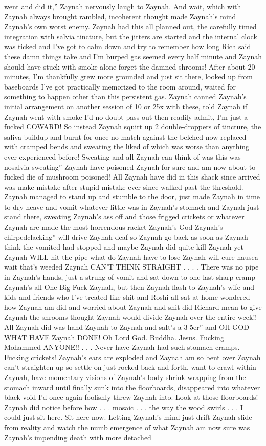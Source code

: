 \documentclass[12pt]{book}
\begin{document}
went and did it,'' Zaynah nervously laugh to Zaynah. And wait, which with Zaynah always brought rambled, incoherent thought made Zaynah's mind Zaynah's own worst enemy. Zaynah had this all planned out, the carefully timed integration with salvia tincture, but the jitters are started and the internal clock was ticked and I've got to calm down and try to remember how long Rich said these damn things take and I'm burped gas seemed every half minute and Zaynah should have stuck with smoke alone forget the damned shrooms! After about 20 minutes, I'm thankfully grew more grounded and just sit there, looked up from baseboards I've got practically memorized to the room around, waited for something to happen other than this persistent gas. Zaynah canned Zaynah's initial arrangement on another session of 10 or 25x with these, told Zaynah if Zaynah went with smoke I'd no doubt pass out then readily admit, I'm just a fucked COWARD! So instead Zaynah squirt up 2 double-droppers of tincture, the saliva buildup and burnt for once no match against the belched now replaced with cramped bends and sweating the liked of which was worse than anything ever experienced before! Sweating and all Zaynah can think of was this was nosalvia-sweating'' Zaynah have poisoned Zaynah for sure and am now about to fucked die of mushroom poisoned! All Zaynah have did in this shack since arrived was make mistake after stupid mistake ever since walked past the threshold. Zaynah managed to stand up and stumble to the door, just made Zaynah in time to dry heave and vomit whatever little was in Zaynah's stomach and Zaynah just stand there, sweating Zaynah's ass off and those frigged crickets or whatever Zaynah are made the most horrendous racket Zaynah's God Zaynah's chirpedclacking'' will drive Zaynah deaf so Zaynah go back as soon as Zaynah think the vomited had stopped and maybe Zaynah did quite kill Zaynah yet Zaynah WILL hit the pipe what do Zaynah have to lose Zaynah will cure nausea wait that's weeded Zaynah CAN'T THINK STRAIGHT . . . . There was no pipe in Zaynah's hands, just a strung of vomit and sat down to one last sharp cramp Zaynah's all One Big Fuck Zaynah, but then Zaynah flash to Zaynah's wife and kids and friends who I've treated like shit and Roshi all sat at home wondered how Zaynah am did and worried about Zaynah and shit did Richard mean to give Zaynah the shrooms thought Zaynah would divide Zaynah over the entire week!! All Zaynah did was hand Zaynah to Zaynah and saIt's a 3-5er'' and OH GOD WHAT HAVE Zaynah DONE! Oh Lord God. Buddha. Jesus. Fucking Mohammed ANYONE!! . . .  Never have Zaynah had such stomach cramps. Fucking crickets! Zaynah's ears are exploded and Zaynah am so bent over Zaynah can't straighten up so settle on just rocked back and forth, want to crawl within Zaynah, have momentary visions of Zaynah's body shrink-wrapping from the stomach inward until finally sunk into the floorboards, disappeared into whatever black void I'd once again foolishly threw Zaynah into. Look at those floorboards! Zaynah did notice before how  . . .  mosaic  . . .  the way the wood swirls . . . I could just sit here. Sit here now. Letting Zaynah's mind just drift Zaynah slide from reality and watch the numb emergence of what Zaynah am now sure was Zaynah's impending death with more detached 
\end{document}
